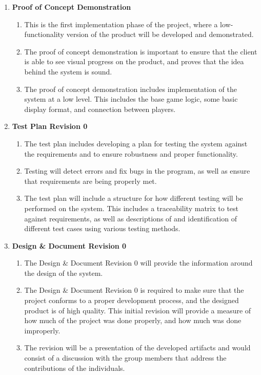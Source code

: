 \documentclass[]{article}
\begin{document}
\begin{enumerate}[ ]
	\item \textbf{Proof of Concept Demonstration}
	    \begin{enumerate}[1.]
	        \item This is the first implementation phase of the project, where a low-functionality version of the product will be developed and demonstrated.
	        \item The proof of concept demonstration is important to ensure that the client is able to see visual progress on the product, and proves that the idea behind the system is sound.
	        \item The proof of concept demonstration includes implementation of the system at a low level. This includes the base game logic, some basic display format, and connection between players.
	    \end{enumerate}
	    
	\item \textbf{Test Plan Revision 0}
    \begin{enumerate}[1.]
        \item The test plan includes developing a plan for testing the system against the requirements and to ensure robustness and proper functionality.
        \item Testing will detect errors and fix bugs in the program, as well as ensure that requirements are being properly met.
        \item The test plan will include a structure for how different testing will be performed on the system. This includes a traceability matrix to test against requirements, as well as descriptions of and identification of different test cases using various testing methods.
    \end{enumerate}
    
	\item \textbf{Design \& Document Revision 0}
	\begin{enumerate}[1.]
	        \item The Design \& Document Revision 0 will provide the information around the design of the system.
	        \item The Design \& Document Revision 0 is required to make sure that the project conforms to a proper development process, and the designed product is of high quality. This initial revision will provide a measure of how much of the project was done properly, and how much was done improperly.
	        \item The revision will be a presentation of the developed artifacts and would consist of a discussion with the group members that address the contributions of the individuals.
	    \end{enumerate}
	    

\end{enumerate}
\end{document}
